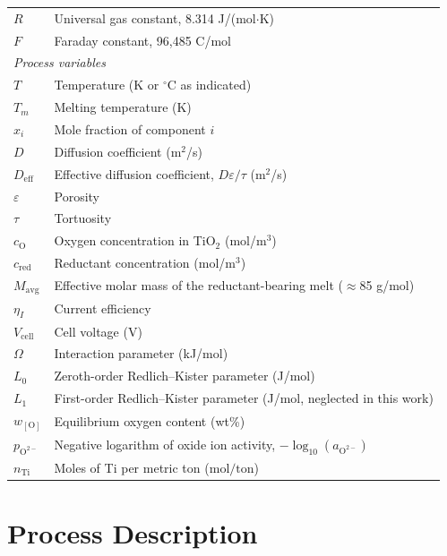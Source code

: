 \documentclass[sn-mathphys,Numbered]{sn-jnl}
\begin{document}
\begin{tabular}{ll}
$R$ & Universal gas constant, 8.314 J/(mol$\cdot$K) \\
$F$ & Faraday constant, 96{,}485 C/mol \\
\multicolumn{2}{l}{\textit{Process variables}} \\
$T$ & Temperature (K or $^{\circ}$C as indicated) \\
$T_m$ & Melting temperature (K) \\
$x_i$ & Mole fraction of component $i$ \\
$D$ & Diffusion coefficient (m$^2$/s) \\
$D_{\mathrm{eff}}$ & Effective diffusion coefficient, $D\varepsilon/\tau$ (m$^2$/s) \\
$\varepsilon$ & Porosity \\
$\tau$ & Tortuosity \\
$c_{\mathrm{O}}$ & Oxygen concentration in TiO$_2$ (mol/m$^3$) \\
$c_{\mathrm{red}}$ & Reductant concentration (mol/m$^3$) \\
$M_{\mathrm{avg}}$ & Effective molar mass of the reductant-bearing melt ($\approx$85 g/mol) \\
$\eta_I$ & Current efficiency \\
$V_{\mathrm{cell}}$ & Cell voltage (V) \\
$\Omega$ & Interaction parameter (kJ/mol) \\
$L_0$ & Zeroth-order Redlich--Kister parameter (J/mol) \\
$L_1$ & First-order Redlich--Kister parameter (J/mol, neglected in this work) \\
$w_{[\mathrm{O}]}$ & Equilibrium oxygen content (wt\%) \\
$p_{\mathrm{O}^{2-}}$ & Negative logarithm of oxide ion activity, $-\log_{10}(a_{\mathrm{O}^{2-}})$ \\
$n_{\mathrm{Ti}}$ & Moles of Ti per metric ton ($\mathrm{mol/ton}$) \\
\end{tabular}

\section{Process Description}
\end{document}
